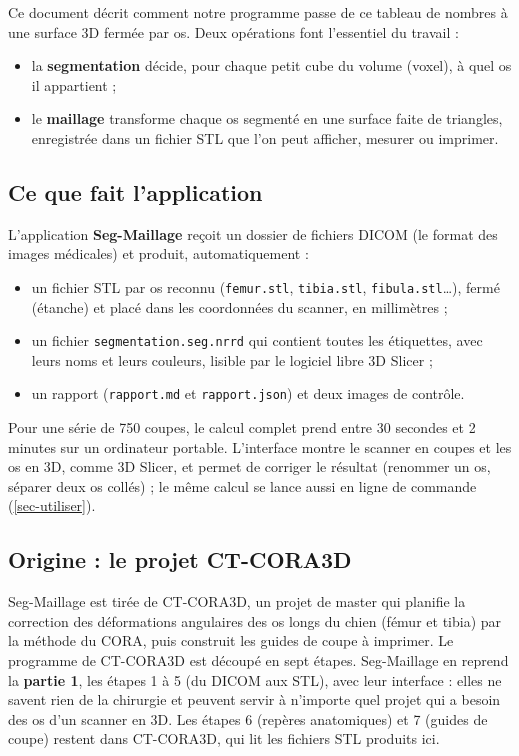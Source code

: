 \documentclass[11pt,a4paper]{article}
\newcommand{\fichier}[1]{\texttt{\small #1}}
\begin{document}
Ce document décrit comment notre programme passe de ce tableau de nombres à une surface 3D fermée par os. Deux
opérations font l'essentiel du travail :
\begin{itemize}
  \item la \textbf{segmentation} décide, pour chaque petit cube du volume (voxel), à quel os il appartient ;
  \item le \textbf{maillage} transforme chaque os segmenté en une surface faite de triangles, enregistrée dans un
  fichier STL que l'on peut afficher, mesurer ou imprimer.
\end{itemize}

\subsection{Ce que fait l'application}

L'application \textbf{Seg-Maillage} reçoit un dossier de fichiers DICOM (le format des images médicales) et produit,
automatiquement :
\begin{itemize}
  \item un fichier STL par os reconnu (\fichier{femur.stl}, \fichier{tibia.stl}, \fichier{fibula.stl}\ldots), fermé
  (étanche) et placé dans les coordonnées du scanner, en millimètres ;
  \item un fichier \fichier{segmentation.seg.nrrd} qui contient toutes les étiquettes, avec leurs noms et leurs
  couleurs, lisible par le logiciel libre 3D Slicer \cite{fedorov2012} ;
  \item un rapport (\fichier{rapport.md} et \fichier{rapport.json}) et deux images de contrôle.
\end{itemize}
Pour une série de 750 coupes, le calcul complet prend entre 30 secondes et 2 minutes sur un ordinateur portable.
L'interface montre le scanner en coupes et les os en 3D, comme 3D Slicer, et permet de corriger le résultat (renommer
un os, séparer deux os collés) ; le même calcul se lance aussi en ligne de commande (\cref{sec-utiliser}).

\subsection{Origine : le projet CT-CORA3D}

Seg-Maillage est tirée de CT-CORA3D, un projet de master qui planifie la correction des déformations angulaires des os
longs du chien (fémur et tibia) par la méthode du CORA, puis construit les guides de coupe à imprimer. Le programme de
CT-CORA3D est découpé en sept étapes. Seg-Maillage en reprend la \textbf{partie 1}, les étapes 1 à 5 (du DICOM aux
STL), avec leur interface : elles ne savent rien de la chirurgie et peuvent servir à n'importe quel projet qui a besoin
des os d'un scanner en 3D. Les étapes 6 (repères anatomiques) et 7 (guides de coupe) restent dans CT-CORA3D, qui lit
les fichiers STL produits ici.
\end{document}
